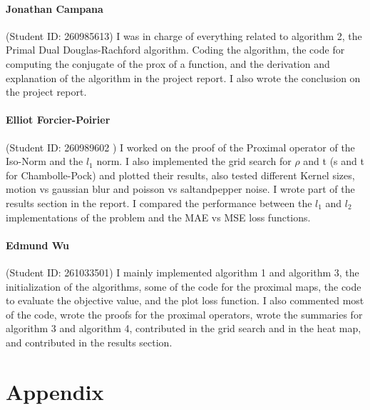 \documentclass{article}
\theoremstyle{definition}
\theoremstyle{remark}
\begin{document}
\paragraph{Jonathan Campana} (Student ID: 260985613) I was in charge of everything related to algorithm 2, the Primal Dual Douglas-Rachford algorithm. Coding the algorithm, the code for computing the conjugate of the prox of a function, and the derivation and explanation of the algorithm in the project report. I also wrote the conclusion on the project report. 
\paragraph{Elliot Forcier-Poirier} (Student ID: 260989602 ) I worked on the proof of the Proximal operator of the Iso-Norm and the $l_1$ norm. I also implemented the grid search for $\rho$ and t (s and t for Chambolle-Pock) and plotted their results, also tested different Kernel sizes, motion vs gaussian blur and poisson vs saltandpepper noise. I wrote part of the results section in the report. I compared the performance between the $l_1$ and $l_2$ implementations of the problem and the MAE vs MSE loss functions.
\paragraph{Edmund Wu} (Student ID: 261033501) I mainly implemented algorithm 1 and algorithm 3, the initialization of the algorithms, some of the code for the proximal maps, the code to evaluate the objective value, and the plot loss function. I also commented most of the code, wrote the proofs for the proximal operators, wrote the summaries for algorithm 3 and algorithm 4, contributed in the grid search and in the heat map, and contributed in the results section.



\medskip




\newpage 
\appendix


\section{Appendix}
\end{document}
